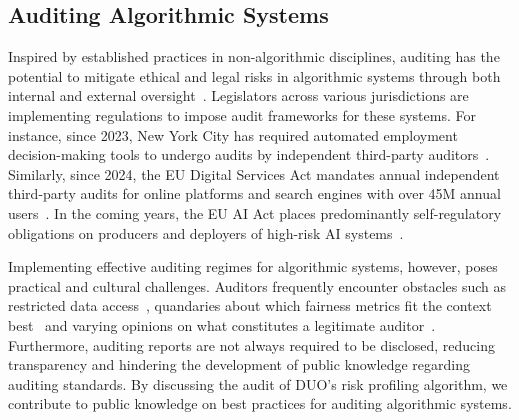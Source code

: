 \subsection{Auditing Algorithmic Systems}
Inspired by established practices in non-algorithmic disciplines, auditing has the potential to mitigate ethical and legal risks in algorithmic systems through both internal and external oversight~\citep{raji2022outsider}. Legislators across various jurisdictions are implementing regulations to impose audit frameworks for these systems. For instance, since 2023, New York City has required automated employment decision-making tools to undergo audits by independent third-party auditors~\citep{LL144}. Similarly, since 2024, the EU Digital Services Act mandates annual independent third-party audits for online platforms and search engines with over 45M annual users~\cite{DSA}. In the coming years, the EU AI Act places predominantly self-regulatory obligations on producers and deployers of high-risk AI systems~\cite{AIAct}. 

Implementing effective auditing regimes for algorithmic systems, however, poses practical and cultural challenges. Auditors frequently encounter obstacles such as restricted data access~\citep{groves24}, quandaries about which fairness metrics fit the context best~\citep{corbett2023measure} and varying opinions on what constitutes a legitimate auditor~\citep{groves24}. Furthermore, auditing reports are not always required to be disclosed, reducing transparency and hindering the development of public knowledge regarding auditing standards. By discussing the audit of DUO's risk profiling algorithm, we contribute to public knowledge on best practices for auditing algorithmic systems.

%